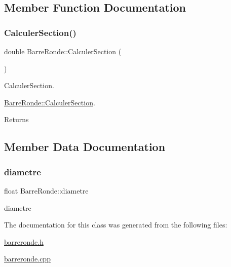\subsection{Member Function Documentation}
\mbox{\label{class_barre_ronde_adc6f65b51c7ca244fb29f2ed4b9a6f91}} 
\subsubsection{\texorpdfstring{Calculer\+Section()}{CalculerSection()}}
{\footnotesize\ttfamily double Barre\+Ronde\+::\+Calculer\+Section (\begin{DoxyParamCaption}{ }\end{DoxyParamCaption})}



Calculer\+Section. 

\hyperlink{class_barre_ronde_adc6f65b51c7ca244fb29f2ed4b9a6f91}{Barre\+Ronde\+::\+Calculer\+Section}.

\begin{DoxyReturn}{Returns}

\end{DoxyReturn}


\subsection{Member Data Documentation}
\mbox{\label{class_barre_ronde_ac1df0f24c2bbbb4fdb9533fa94639e92}} 
\subsubsection{\texorpdfstring{diametre}{diametre}}
{\footnotesize\ttfamily float Barre\+Ronde\+::diametre\hspace{0.3cm}{\ttfamily [protected]}}



diametre 



The documentation for this class was generated from the following files\+:\begin{DoxyCompactItemize}
\item 
\hyperlink{barreronde_8h}{barreronde.\+h}\item 
\hyperlink{barreronde_8cpp}{barreronde.\+cpp}\end{DoxyCompactItemize}
